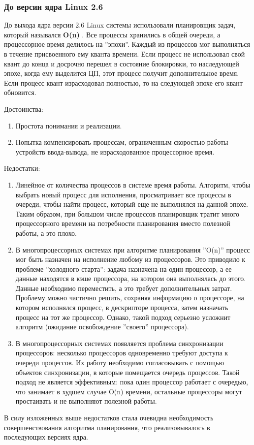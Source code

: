 \subsubsection{До версии ядра Linux 2.6}
До выхода ядра версии 2.6 Linux системы использовали планировщик задач, который назывался \textbf{O(n)} \cite{ibmLinux}. Все процессы хранились в общей очереди, а процессорное время делилось на ''эпохи''. Каждый из процессов мог выполняться в течение присвоенного ему кванта времени. Если процесс не использовал свой квант до конца и досрочно перешел в состояние блокировки, то наследующей эпохе, когда ему выделится ЦП, этот процесс получит дополнительное время. Если процесс квант израсходовал полностью, то на следующей эпохе его квант обновится.

Достоинства:
\begin{enumerate}[label=---]
\item Простота понимания и реализации.
\item Попытка компенсировать процессам, ограниченным скоростью работы устройств ввода-вывода, не израсходованное процессорное время.
\end{enumerate}

Недостатки:
\begin{enumerate}[label=---]
\item Линейное от количества процессов в системе время работы. Алгоритм, чтобы выбрать новый процесс для исполнения, просматривает все процессы в очереди, чтобы найти процесс, который еще не выполнялся на данной эпохе. Таким образом, при большом числе процессов планировщик тратит много процессорного времени на потребности планирования вместо полезной работы, а это плохо.

\item В многопроцессорных системах при алгоритме планирования ''O(n)'' процесс мог быть назначен на исполнение любому из процессоров. Это приводило к проблеме ''холодного старта'': задача назначена на один процессор, а ее данные находятся в кэше процессора, на котором она выполнялась до этого. Данные необходимо переместить, а это требует дополнительных затрат. Проблему можно частично решить, сохраняя информацию о процессоре, на котором исполнялся процесс, в дескрипторе процесса, затем назначать процесс на тот же процессор. Однако, такой подход серьезно усложнит алгоритм (ожидание освобождение ''своего'' процессора).

\item В многопроцессорных системах появляется проблема синхронизации процессоров: несколько процессоров одновременно требуют доступа к очереди процессов. Их работу необходимо согласовывать с помощью объектов синхронизации, в которые помещается очередь процессов. Такой подход не является эффективным: пока один процессор работает с очередью, что занимает в худшем случае O(n) времени, остальные процессоры могут простаивать и не выполняют полезной работы.
    
\end{enumerate}
В силу изложенных выше недостатков стала очевидна необходимость совершенствования алгоритма планирования, что реализовывалось в последующих версиях ядра.

